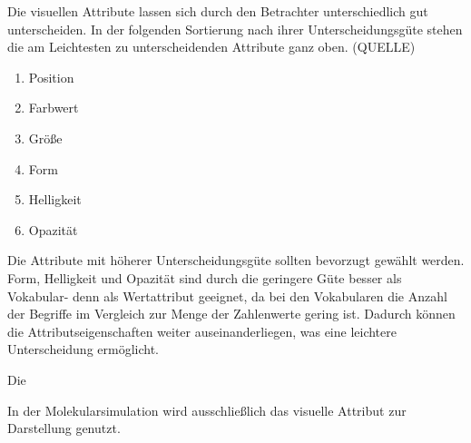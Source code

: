 Die visuellen Attribute lassen sich durch den Betrachter unterschiedlich gut unterscheiden. In der folgenden Sortierung nach ihrer Unterscheidungsgüte stehen die am Leichtesten zu unterscheidenden Attribute ganz oben. (QUELLE)
\begin{enumerate}
	\item Position
	\item Farbwert
	\item Größe
	\item Form
	\item Helligkeit
	\item Opazität
\end{enumerate}

Die Attribute mit höherer Unterscheidungsgüte sollten bevorzugt gewählt werden. Form, Helligkeit und Opazität sind durch die geringere Güte besser als Vokabular- denn als Wertattribut geeignet, da bei den Vokabularen die Anzahl der Begriffe im Vergleich zur Menge der Zahlenwerte gering ist. Dadurch können die Attributseigenschaften weiter auseinanderliegen, was eine leichtere Unterscheidung ermöglicht.

Die 

In der  Molekularsimulation wird ausschließlich das visuelle Attribut  zur Darstellung genutzt.

